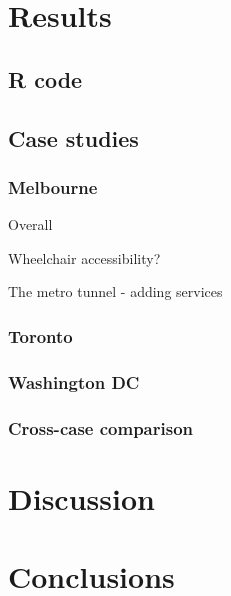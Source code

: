 \documentclass[numbered]{trbunofficial}
\begin{document}
\hypertarget{results}{%
\section{Results}\label{results}}

\hypertarget{r-code}{%
\subsection{R code}\label{r-code}}

\hypertarget{case-studies}{%
\subsection{Case studies}\label{case-studies}}

\hypertarget{melbourne}{%
\subsubsection{Melbourne}\label{melbourne}}

Overall

Wheelchair accessibility?

The metro tunnel - adding services

\hypertarget{toronto}{%
\subsubsection{Toronto}\label{toronto}}

\hypertarget{washington-dc}{%
\subsubsection{Washington DC}\label{washington-dc}}

\hypertarget{cross-case-comparison}{%
\subsubsection{Cross-case comparison}\label{cross-case-comparison}}

\hypertarget{discussion}{%
\section{Discussion}\label{discussion}}

\hypertarget{conclusions}{%
\section{Conclusions}\label{conclusions}}
\end{document}
